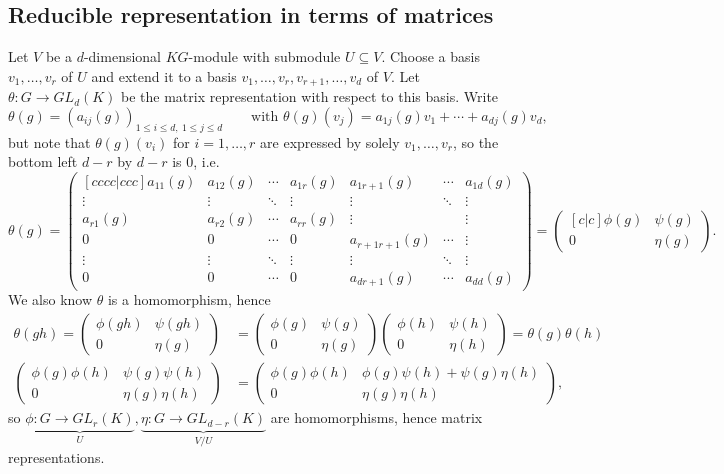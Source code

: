 \documentclass[a4paper]{article}
\theoremstyle{definition}
\begin{document}
\subsection{Reducible representation in terms of matrices}
\label{subsection:reducrepandblockdiagmat}
Let $V$ be a $d$-dimensional $KG$-module with submodule $U\subseteq V$. Choose a basis $v_1,\ldots,v_r$ of $U$ and extend it to a basis $v_1,\ldots,v_r,v_{r+1},\ldots,v_d$ of $V$. Let $\theta:G\rightarrow GL_d(K)$ be the matrix representation with respect to this basis. Write
\[
\theta(g)=(a_{ij}(g))_{1\leq i\leq d,\ 1\leq j\leq d} \qquad \text{with } \theta(g)(v_j)=a_{1j}(g)v_1+\cdots+a_{dj}(g)v_d, 
\]
but note that $\theta(g)(v_i)$ for $i=1,\ldots,r$ are expressed by solely $v_1,\ldots,v_r$, so the bottom left $d-r$ by $d-r$ is 0, i.e.
\[
\theta(g)=\begin{pmatrix}[cccc|ccc]
a_{11}(g) & a_{12}(g) & \cdots & a_{1r}(g) & a_{1r+1}(g) & \cdots & a_{1d}(g)\\
\vdots & \vdots & \ddots & \vdots & \vdots & \ddots & \vdots \\
a_{r1}(g) & a_{r2}(g) & \cdots & a_{rr}(g) & \vdots & & \vdots \\ \hline
0 & 0 & \cdots & 0 & a_{r+1r+1}(g) & \cdots & \vdots \\
\vdots & \vdots & \ddots & \vdots & \vdots & \ddots & \vdots \\
0 & 0 & \cdots & 0 & a_{dr+1}(g) & \cdots & a_{dd}(g)
\end{pmatrix}=\begin{pmatrix}[c|c]
\phi(g)&\psi(g)\\ \hline
0 & \eta(g)
\end{pmatrix}.
\]
We also know $\theta$ is a homomorphism, hence
\[
\begin{aligned}
\theta(gh)=\begin{pmatrix}\phi(gh)&\psi(gh)\\0 & \eta(g)\end{pmatrix}&=\begin{pmatrix}\phi(g)&\psi(g)\\0 & \eta(g)\end{pmatrix}\begin{pmatrix}\phi(h)&\psi(h)\\0 & \eta(h)\end{pmatrix}=\theta(g)\theta(h)\\
\begin{pmatrix}\phi(g)\phi(h)&\psi(g)\psi(h)\\0&\eta(g)\eta(h)\end{pmatrix}&=\begin{pmatrix}\phi(g)\phi(h)&\phi(g)\psi(h)+\psi(g)\eta(h)\\0&\eta(g)\eta(h)\end{pmatrix},
\end{aligned}
\]
so $\underbrace{\phi:G\rightarrow GL_r(K)}_{U},\underbrace{\eta:G\rightarrow GL_{d-r}(K)}_{V/U}$ are homomorphisms, hence matrix representations.
\end{document}
